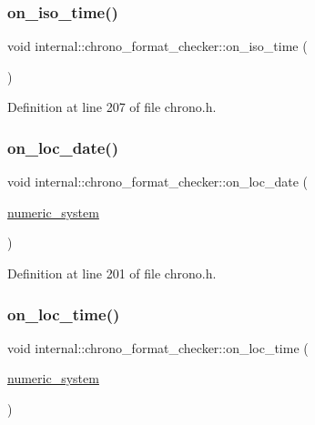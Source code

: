 \subsubsection{\texorpdfstring{on\+\_\+iso\+\_\+time()}{on\_iso\_time()}}
{\footnotesize\ttfamily void internal\+::chrono\+\_\+format\+\_\+checker\+::on\+\_\+iso\+\_\+time (\begin{DoxyParamCaption}{ }\end{DoxyParamCaption})\hspace{0.3cm}{\ttfamily [inline]}}



Definition at line 207 of file chrono.\+h.

\mbox{\label{structinternal_1_1chrono__format__checker_a0c8193c44ef01f2152ab8d1c5ee17312}} 
\subsubsection{\texorpdfstring{on\+\_\+loc\+\_\+date()}{on\_loc\_date()}}
{\footnotesize\ttfamily void internal\+::chrono\+\_\+format\+\_\+checker\+::on\+\_\+loc\+\_\+date (\begin{DoxyParamCaption}\item[{\hyperlink{namespaceinternal_a16e2a1195ca0f5beab658685f71df86b}{numeric\+\_\+system}}]{ }\end{DoxyParamCaption})\hspace{0.3cm}{\ttfamily [inline]}}



Definition at line 201 of file chrono.\+h.

\mbox{\label{structinternal_1_1chrono__format__checker_aec947dff8c3e8227d7c19e3f5d8ca6ca}} 
\subsubsection{\texorpdfstring{on\+\_\+loc\+\_\+time()}{on\_loc\_time()}}
{\footnotesize\ttfamily void internal\+::chrono\+\_\+format\+\_\+checker\+::on\+\_\+loc\+\_\+time (\begin{DoxyParamCaption}\item[{\hyperlink{namespaceinternal_a16e2a1195ca0f5beab658685f71df86b}{numeric\+\_\+system}}]{ }\end{DoxyParamCaption})\hspace{0.3cm}{\ttfamily [inline]}}



